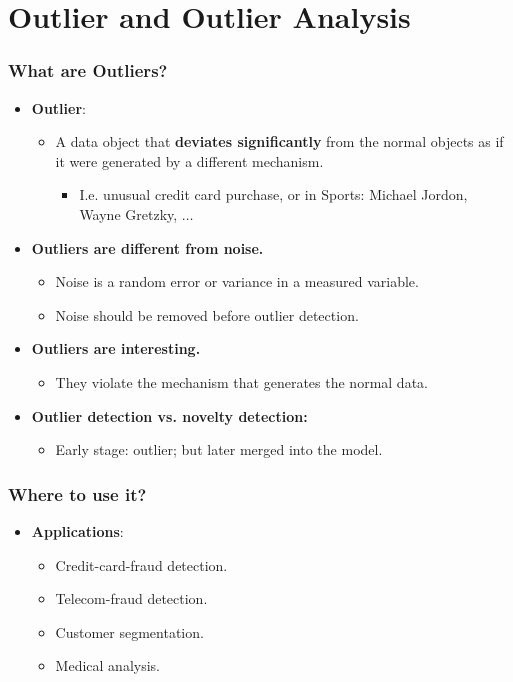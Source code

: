 \section{Outlier and Outlier Analysis}


\begin{frame}
  \frametitle{What are Outliers?}
  \begin{itemize}
  \item \textbf{Outlier}:
    \begin{itemize}
    \item A data object that \textbf{\color{airforceblue}deviates significantly} from the normal objects as if it were generated by a different mechanism.
      \begin{itemize}
      \item I.e. unusual credit card purchase, or in Sports: Michael Jordon, Wayne Gretzky, $\ldots$
      \end{itemize}
    \end{itemize}
  \item \textbf{Outliers are different from noise.}
    \begin{itemize}
    \item Noise is a random error or variance in a measured variable.
    \item Noise should be removed before outlier detection.
    \end{itemize}
  \item \textbf{Outliers are interesting.}
    \begin{itemize}
    \item They violate the mechanism that generates the normal data.
    \end{itemize}
  \item \textbf{Outlier detection vs. novelty detection:}
    \begin{itemize}
    \item Early stage: outlier; but later merged into the model.
    \end{itemize}
  \end{itemize}
\end{frame}


\begin{frame}
  \frametitle{Where to use it?}
  \begin{itemize}
  \item \textbf{Applications}:
    \begin{itemize}
    \item Credit-card-fraud detection.
    \item Telecom-fraud detection.
    \item Customer segmentation.
    \item Medical analysis.
    \end{itemize}
  \end{itemize}
\end{frame}


